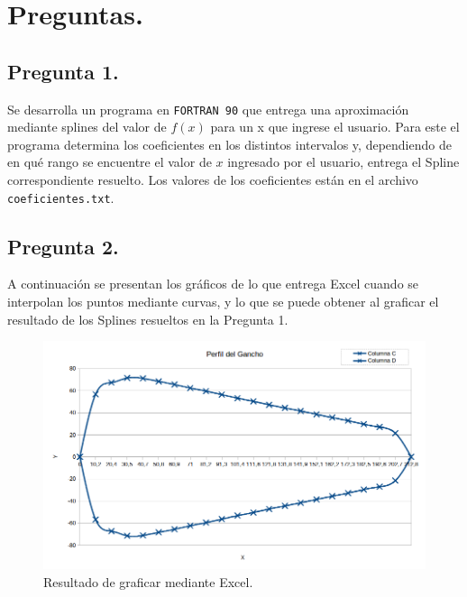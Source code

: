 \documentclass[12pt, notitlepage]{article}
\begin{document}
\section{Preguntas.}

\subsection{Pregunta 1.}

Se desarrolla un programa en \texttt{FORTRAN 90} que entrega una aproximación mediante splines del valor de $f(x)$ para un x que ingrese el usuario. Para este el programa determina los coeficientes en los distintos intervalos y, dependiendo de en qué rango se encuentre el valor de $x$ ingresado por el usuario, entrega el Spline correspondiente resuelto. Los valores de los coeficientes están en el archivo \texttt{coeficientes.txt}.

\subsection{Pregunta 2.}
A continuación se presentan los gráficos de lo que entrega Excel cuando se interpolan los puntos mediante curvas, y lo que se puede obtener al graficar el resultado de los Splines resueltos en la Pregunta 1.

\begin{figure}[H]
\centering
\includegraphics[scale=0.5]{Excel_Gancho.png}
\caption{Resultado de graficar mediante Excel.}
\end{figure}
\end{document}
